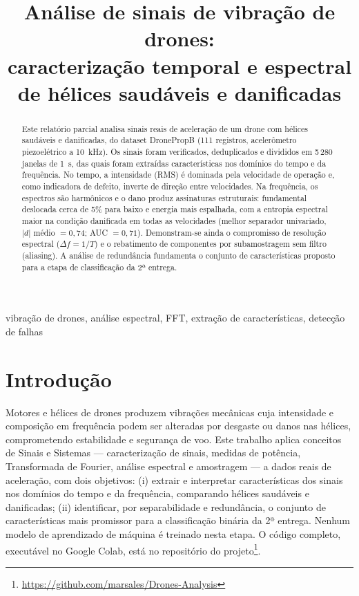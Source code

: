 \documentclass[conference]{IEEEtran}
\title{Análise de sinais de vibração de drones:\\caracterização temporal e espectral de hélices saudáveis e danificadas}
\author{
\IEEEauthorblockN{Fernando Luis Campelo dos Anjos}
\IEEEauthorblockA{Centro de Informática — UFPE\\Recife, Brasil}
\and
\IEEEauthorblockN{Ludmila Cabral Lopes Magnani}
\IEEEauthorblockA{Centro de Informática — UFPE\\Recife, Brasil}
\and
\IEEEauthorblockN{Marina Rodas Sales}
\IEEEauthorblockA{Centro de Informática — UFPE\\Recife, Brasil}
}
\begin{document}
\maketitle

\begin{abstract}
Este relatório parcial analisa sinais reais de aceleração de um drone com hélices saudáveis e danificadas, do dataset DronePropB (111 registros, acelerômetro piezoelétrico a 10~kHz). Os sinais foram verificados, deduplicados e divididos em 5\,280 janelas de 1~s, das quais foram extraídas características nos domínios do tempo e da frequência. No tempo, a intensidade (RMS) é dominada pela velocidade de operação e, como indicadora de defeito, inverte de direção entre velocidades. Na frequência, os espectros são harmônicos e o dano produz assinaturas estruturais: fundamental deslocada cerca de 5\% para baixo e energia mais espalhada, com a entropia espectral maior na condição danificada em todas as velocidades (melhor separador univariado, $|d|$ médio $=0{,}74$; AUC $=0{,}71$). Demonstram-se ainda o compromisso de resolução espectral ($\Delta f = 1/T$) e o rebatimento de componentes por subamostragem sem filtro (aliasing). A análise de redundância fundamenta o conjunto de características proposto para a etapa de classificação da 2ª entrega.
\end{abstract}

\begin{IEEEkeywords}
vibração de drones, análise espectral, FFT, extração de características, detecção de falhas
\end{IEEEkeywords}

\section{Introdução}
Motores e hélices de drones produzem vibrações mecânicas cuja intensidade e composição em frequência podem ser alteradas por desgaste ou danos nas hélices, comprometendo estabilidade e segurança de voo. Este trabalho aplica conceitos de Sinais e Sistemas --- caracterização de sinais, medidas de potência, Transformada de Fourier, análise espectral e amostragem --- a dados reais de aceleração, com dois objetivos: (i) extrair e interpretar características dos sinais nos domínios do tempo e da frequência, comparando hélices saudáveis e danificadas; (ii) identificar, por separabilidade e redundância, o conjunto de características mais promissor para a classificação binária da 2ª entrega. Nenhum modelo de aprendizado de máquina é treinado nesta etapa. O código completo, executável no Google Colab, está no repositório do projeto\footnote{\url{https://github.com/marsales/Drones-Analysis}}.
\end{document}
